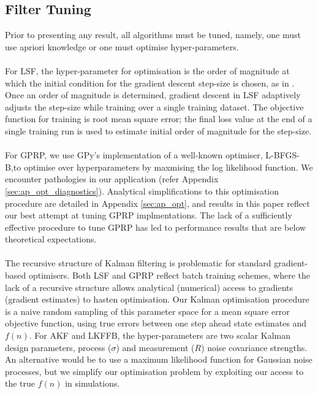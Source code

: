 \subsection{Filter Tuning}
Prior to presenting any result, all algorithms must be tuned, namely, one must use apriori knowledge or one must optimise hyper-parameters. 
\\
\\
For LSF, the hyper-parameter for optimisation is the order of magnitude at which the initial condition for the gradient descent step-size is chosen, as in \cite{mavadia2017}. Once an order of magnitude is determined, gradient descent in LSF adaptively adjusts the step-size while training over a single training dataset. The objective function for training is root mean square error; the final loss value at the end of a single training run is used to estimate initial order of magnitude for the step-size. 
\\
\\
For GPRP, we use GPy's implementation of a well-known optimiser, L-BFGS-B,to optimise over hyperparameters by maxmising the log likelihood function. We encounter pathologies in our application (refer Appendix \ref{sec:ap_opt_diagnostics}). Analytical simplifications to this optimisation procedure are detailed in Appendix \ref{sec:ap_opt}, and results in this paper reflect our best attempt at tuning GPRP implmentations. The lack of a sufficiently effective procedure to tune GPRP has led to performance results that are below theoretical expectations. 
\\
\\
The recursive structure of Kalman filtering is problematic for standard gradient-based optimisers. Both LSF and GPRP reflect batch training schemes, where the lack of a recursive structure allows analytical (numerical) access to gradients (gradient estimates) to hasten optimisation. Our Kalman optimisation procedure is a naive random sampling of this parameter space for a mean square error objective function, using true errors between one step ahead state estimates and $f(n)$. For AKF and LKFFB, the hyper-parameters are two scalar Kalman design parameters, process ($\sigma$) and measurement ($R$) noise covariance strengths. An alternative would be to use a maximum likelihood function for Gaussian noise processes, but we simplify our optimisation problem by exploiting our access to the true $f(n)$ in simulations. 
\\
\\
